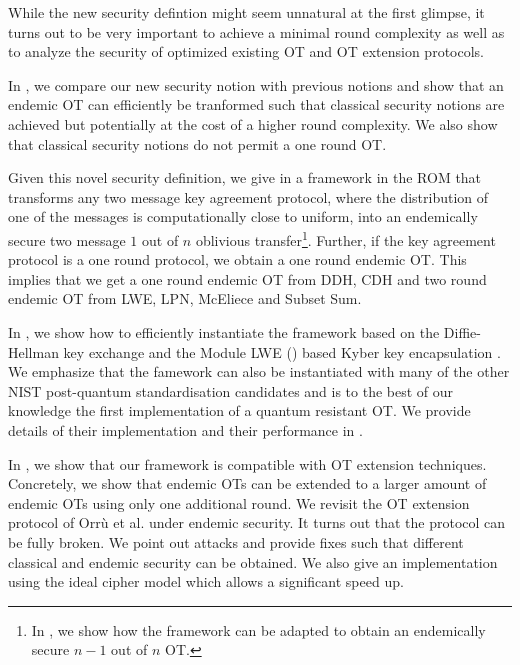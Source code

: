While the new security defintion might seem unnatural at the first glimpse, it turns out to be very important to achieve a minimal round complexity as well as to analyze the security of optimized existing OT and OT extension protocols.

In , we compare our new security notion with previous notions and show that an endemic OT can efficiently  be tranformed such that classical security notions are achieved but potentially at the cost of a higher round complexity. We also show that classical security notions do not permit a one round OT.

Given this novel security definition, we give in  a framework in the ROM that transforms any two message key agreement protocol, where the distribution of one of the messages is computationally close to uniform, into an endemically secure two message $1$ out of $n$ oblivious transfer\footnote{In , we show how the framework can be adapted to obtain an endemically secure $n-1$ out of $n$ OT.}. Further, 
if the key agreement protocol is a one round protocol, we obtain a one round endemic OT. This implies that we get a one round endemic OT from DDH, CDH and two round endemic OT from LWE, LPN, McEliece and Subset Sum.

In , we show how to efficiently instantiate the framework based on the Diffie-Hellman key exchange and the Module LWE (\MLWE) based Kyber key encapsulation \cite{NISTPQC-R1:CRYSTALS-KYBER17}. We emphasize that the famework can also be instantiated with many of the other NIST post-quantum standardisation candidates and is to the best of our knowledge the first implementation of a quantum resistant OT. We provide details of their implementation and their performance in .

In , we show that our framework is compatible with OT extension techniques. Concretely, we show that endemic OTs can be extended to a larger amount of endemic OTs using only one additional round. We revisit the OT extension protocol of Orr{\`u} et al. \cite{RSA:OrrOrsSch17} under endemic security. It turns out that the protocol can be fully broken. We point out attacks and provide fixes such that different classical and endemic security can be obtained. We also give an implementation using the ideal cipher model which allows a significant speed up.



